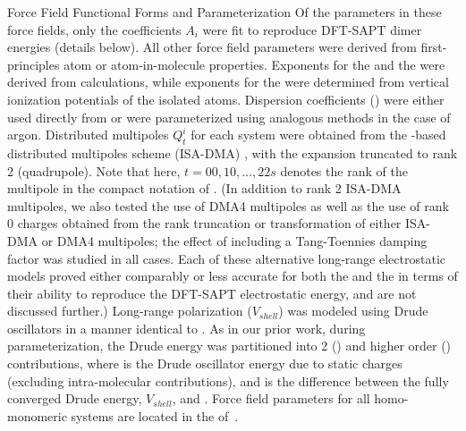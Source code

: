 \begin{subsection}{Force Field Functional Forms and Parameterization}
Of the parameters in these force fields, only the coefficients $A_i$ were fit
to reproduce DFT-SAPT dimer energies (details below). All other force field
parameters were derived from first-principles atom or atom-in-molecule properties.
Exponents for the \isaffold and the \bmsisaff were derived from \bsisa calculations,
while exponents for the \saptff were determined from vertical ionization potentials
of the isolated atoms.
Dispersion coefficients (\C) were either used directly from  or
were parameterized using analogous methods in the case of argon.
Distributed multipoles $Q_t^i$ for each system were obtained from the \bsisa-based
distributed multipoles scheme (ISA-DMA) \cite{Misquitta2014}, with the expansion
truncated to rank 2 (quadrupole). 
Note that here, $t=00,10,\dots,22s$ denotes the rank of the multipole in 
the compact notation of .
(In addition to rank 2 ISA-DMA multipoles, we also tested the use of DMA4
multipoles\cite{Stone2005} 
as well as the use of rank 0 charges obtained from the 
rank truncation or transformation\cite{Ferenczy1997} of either ISA-DMA or DMA4
multipoles; the effect of including a Tang-Toennies damping
factor\cite{McDaniel2013,Tang1984} was studied in all cases.
Each of these alternative long-range electrostatic models proved either
comparably or less accurate for both the \isaffold and the \saptff in terms of their
ability to reproduce the DFT-SAPT electrostatic energy, and are not discussed
further.)
Long-range polarization ($V_{shell}$) was modeled using Drude oscillators in a manner
identical to . As in our prior work, during parameterization,
the Drude energy was partitioned into 2 (\vdrudeind) and 
higher order (\vdrudescf) contributions, where \vdrudeind is the Drude oscillator
energy due to static charges (excluding intra-molecular contributions), and
\vdrudescf is the difference between the fully converged Drude energy,
$V_{shell}$, and \vdrudeind.  Force field parameters for all homo-monomeric
systems are located in the \si of . 


\end{subsection}
